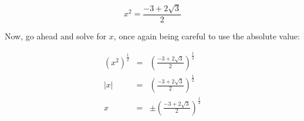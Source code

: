 \documentclass[letterpaper, 12pt]{article}
\begin{document}
\[x^2=\frac{-3+2\sqrt{3}}{2}\]

Now, go ahead and solve for $x$, once again being careful to use the absolute
value:

\begin{eqnarray*}
\left(x^2\right)^{\frac{1}{2}} &=&
    \left(\frac{-3+2\sqrt{3}}{2}\right)^{\frac{1}{2}} \\
|x| &=& \left(\frac{-3+2\sqrt{3}}{2}\right)^{\frac{1}{2}} \\
x &=& \pm\left(\frac{-3+2\sqrt{3}}{2}\right)^{\frac{1}{2}} \\
\end{eqnarray*}
\end{document}
